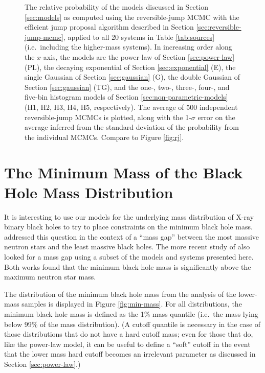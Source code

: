 \documentclass[preprint]{aastex}
\begin{document}
\begin{figure}
  \begin{center}
  \end{center}
  \caption{\label{fig:high-rj-evidence} The relative probability of
    the models discussed in Section \ref{sec:models} as computed using
    the reversible-jump MCMC with the efficient jump proposal
    algorithm described in Section \ref{sec:reversible-jump-mcmc},
    applied to all 20 systems in Table \ref{tab:sources} (i.e.\
    including the higher-mass systems).  In increasing order along the
    $x$-axis, the models are the power-law of Section
    \ref{sec:power-law} (PL), the decaying exponential of Section
    \ref{sec:exponential} (E), the single Gaussian of Section
    \ref{sec:gaussian} (G), the double Gaussian of Section
    \ref{sec:gaussian} (TG), and the one-, two-, three-, four-, and
    five-bin histogram models of Section
    \ref{sec:non-parametric-models} (H1, H2, H3, H4, H5,
    respectively).  The average of 500 independent reversible-jump
    MCMCs is plotted, along with the 1-$\sigma$ error on the average
    inferred from the standard deviation of the probability from the
    individual MCMCs.  Compare to Figure \ref{fig:rj}.}
\end{figure}


\section{The Minimum Mass of the Black Hole Mass Distribution}
\label{sec:minimum-mass}

It is interesting to use our models for the underlying mass
distribution of X-ray binary black holes to try to place constraints
on the minimum black hole mass.  \citet{Bailyn1998} addressed this
question in the context of a ``mass gap'' between the most massive
neutron stars and the least massive black holes.  The more recent
study of \citet{Ozel2010} also looked for a mass gap using a subset of
the models and systems presented here.  Both works found that the
minimum black hole mass is significantly above the maximum neutron
star mass.  

The distribution of the minimum black hole mass from the analysis of
the lower-mass samples is displayed in Figure \ref{fig:min-mass}.  For
all distributions, the minimum black hole mass is defined as the 1\%
mass quantile (i.e.\ the mass lying below 99\% of the mass
distribution).  (A cutoff quantile is necessary in the case of those
distributions that do not have a hard cutoff mass; even for those that
do, like the power-law model, it can be useful to define a ``soft''
cutoff in the event that the lower mass hard cutoff becomes an
irrelevant parameter as discussed in Section \ref{sec:power-law}.)
\end{document}
